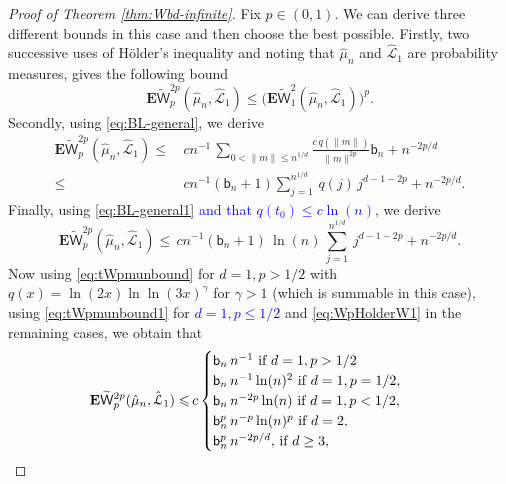 \documentclass[12pt]{article}
\newcommand{\Leb}{\mathcal{L}}
\newcommand{\bn}{   \mathsf b_{n}}
\newcommand{\1}{\mathbf{1}}
\newcommand{\dy}[1]{\textcolor{blue}{#1}}
\newcommand{\dy}[1]{#1}%
\begin{document}
{{{{{\begin{proof}[Proof of Theorem \ref{thm:Wbd-infinite}]
Fix $ p\in (0,1)$. {We can derive three different bounds in this case and then choose the best possible. Firstly, two successive uses of H\"{o}lder's inequality and noting that $\hat{\mu}_n$ and $\hat{\Leb}_1$ are probability measures, gives the following bound}
%
\begin{equation}
\label{eq:WpHolderW1}
 \mathbf{E}   \widetilde{\mathsf W }_{p}^{2p}(\hat \mu _{n},\hat{\Leb}_{1}) \leqslant \big( \mathbf{E} \widetilde{\mathsf W }_{1}^{2}(\hat \mu _{n},\hat{\Leb}_{1}) \big)^{p}.
\end{equation}
{Secondly, using \eqref{eq:BL-general}, we derive}
%
\begin{align}
\mathbf{E}   \widetilde{\mathsf W }_{p}^{2p}(\hat \mu _{n},\hat{\Leb}_{1})
 \leqslant & \,
c n^{-1} \, \sum_{0< \| m \|  \leqslant n^{1/d}}\frac{c \, {q(\|m\|)}}{ \| m \| ^{2p}} \bn +n^{-2p/d} \nonumber \\
\label{eq:tWpmunbound} \leqslant & \, c
n^{-1} (\bn   + 1){\sum_{j= 1}^{n^{1/d}} \, {q(j)} \, j^{d-1-2p}}+n^{-2p/d}.
\end{align}
%
{Finally, using \eqref{eq:BL-general1} \dy{and that $q(t_0) \leq c\ln(n)$}, we derive}
%
\begin{equation}
\label{eq:tWpmunbound1}
\mathbf{E}   \widetilde{\mathsf W }_{p}^{2p}(\hat \mu _{n},\hat{\Leb}_{1})  \leqslant \, c
n^{-1} (\bn   + 1)\, \ln(n) \, {\sum_{j= 1}^{n^{1/d}} \, j^{d-1-2p}}+n^{-2p/d}.
\end{equation}
%
{Now using \eqref{eq:tWpmunbound} for $d = 1, p > 1/2$ with $q(x) = \ln(2x) \ln \ln(3x)^{\gamma}$ for $\gamma > 1$ (which is summable in this case), using \eqref{eq:tWpmunbound1} for \dy{$d =1, p \leq 1/2$} and \eqref{eq:WpHolderW1} in the remaining cases, we obtain that}
%
\begin{align*}
\mathbf{E} \widetilde{\mathsf W }_{p}^{2p}(\hat \mu _{n},\hat{\Leb}_{1})\leqslant & \, c  \begin{cases}
\bn \, n^{-1}$  if $d= 1,p>1/2 \\
{\bn \, n^{-1} \ln(n)^2}$  if ${d = 1, p = 1/2}, \\
{\bn \, n^{-2p} \ln(n)}$ if ${d = 1,p < 1/2}, \\
{ \bn^p \, n^{-p} \ln(n)^p}$  if ${d =2}, \\
\bn^p \, n^{-2p/d},$  if $d \geq 3 , \\
 \end{cases}
\end{align*}
%


\end{proof}}}}}}
\end{document}
